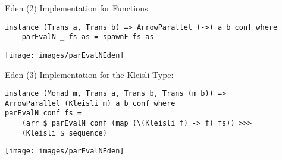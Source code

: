 \begin{frame}[fragile]{Eden (2)}
Implementation for Functions
\begin{lstlisting}[frame=htrbl]
instance (Trans a, Trans b) => ArrowParallel (->) a b conf where
	parEvalN _ fs as = spawnF fs as
\end{lstlisting}
\begin{center}
\texttt{[image: images/parEvalNEden]}
\end{center}
\end{frame}

\begin{frame}[fragile]{Eden (3)}
Implementation for the Kleisli Type:
\begin{lstlisting}[frame=htrbl]
instance (Monad m, Trans a, Trans b, Trans (m b)) =>
ArrowParallel (Kleisli m) a b conf where
parEvalN conf fs =
	(arr $ parEvalN conf (map (\(Kleisli f) -> f) fs)) >>>
	(Kleisli $ sequence)
\end{lstlisting}
\begin{center}
\texttt{[image: images/parEvalNEden]}
\end{center}
\end{frame}